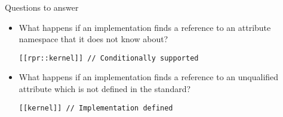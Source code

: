 \begin{frame}[t,fragile]{Questions to answer}
\begin{itemize}
  \item What happens if an implementation finds a reference to an 
        attribute namespace that it does not know about?

\begin{lstlisting}
[[rpr::kernel]] // Conditionally supported
\end{lstlisting}

  \item What happens if an implementation finds a reference to an 
        unqualified attribute which is not defined in the standard?
\begin{lstlisting}
[[kernel]] // Implementation defined
\end{lstlisting}
\end{itemize}
\end{frame}
